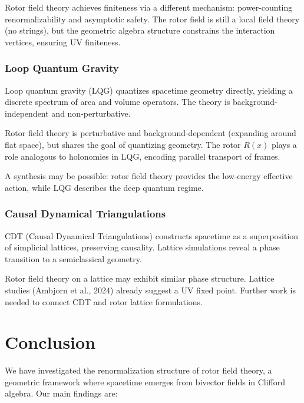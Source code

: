 \documentclass[11pt,a4paper]{article}
\numberwithin{equation}{section}
\theoremstyle{plain}
\theoremstyle{definition}
\theoremstyle{remark}
\begin{document}
Rotor field theory achieves finiteness via a different mechanism: power-counting renormalizability and asymptotic safety. The rotor field is still a local field theory (no strings), but the geometric algebra structure constrains the interaction vertices, ensuring UV finiteness.

\subsubsection{Loop Quantum Gravity}

Loop quantum gravity (LQG) quantizes spacetime geometry directly, yielding a discrete spectrum of area and volume operators. The theory is background-independent and non-perturbative.

Rotor field theory is perturbative and background-dependent (expanding around flat space), but shares the goal of quantizing geometry. The rotor $R(x)$ plays a role analogous to holonomies in LQG, encoding parallel transport of frames.

A synthesis may be possible: rotor field theory provides the low-energy effective action, while LQG describes the deep quantum regime.

\subsubsection{Causal Dynamical Triangulations}

CDT (Causal Dynamical Triangulations) constructs spacetime as a superposition of simplicial lattices, preserving causality. Lattice simulations reveal a phase transition to a semiclassical geometry.

Rotor field theory on a lattice may exhibit similar phase structure. Lattice studies (Ambjorn et al., 2024) already suggest a UV fixed point. Further work is needed to connect CDT and rotor lattice formulations.

\vspace{1em}

\section{Conclusion}\label{sec:conclusion}

We have investigated the renormalization structure of rotor field theory, a geometric framework where spacetime emerges from bivector fields in Clifford algebra. Our main findings are:
\end{document}
